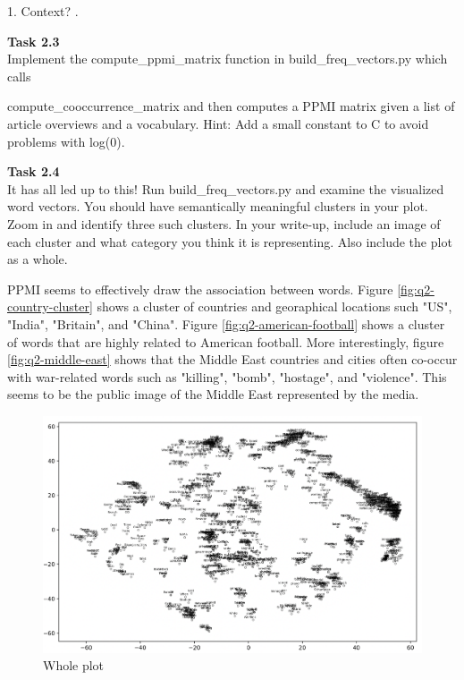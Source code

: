 \documentclass[12pt,article]{article}
\newenvironment{task}[2][Task]
    { \begin{mdframed}[backgroundcolor=gray!20] \textbf{#1 #2} \\}
    {  \end{mdframed}}
\begin{document}
1. Context? . 

\begin{task}{2.3} 
Implement the compute\_ppmi\_matrix function in build\_freq\_vectors.py which calls 

compute\_cooccurrence\_matrix and then computes a PPMI matrix given a list of article overviews and a vocabulary. Hint: Add a small constant to C to avoid problems with log(0).
\end{task}

\newpage
\begin{task}{2.4} 
It has all led up to this! Run build\_freq\_vectors.py and examine the visualized word vectors. You should have semantically meaningful clusters in your plot. Zoom in and identify three such clusters. In your write-up, include an image of each cluster and what category you think it is representing. Also include the plot as a whole.
\end{task}

PPMI seems to effectively draw the association between words. Figure \ref{fig:q2-country-cluster} shows a cluster of countries and georaphical locations such "US", "India", "Britain", and "China". Figure \ref{fig:q2-american-football} shows a cluster of words that are highly related to American football. More interestingly, figure \ref{fig:q2-middle-east} shows that the Middle East countries and cities often co-occur with war-related words such as "killing", "bomb", "hostage", and "violence". This seems to be the public image of the Middle East represented by the media.

\begin{figure}[H]
    \centering
    \includegraphics[scale=0.5]{whole_plot.png} \par
    \caption{Whole plot}
    \label{fig:q2-overview}
\end{figure}
\end{document}
